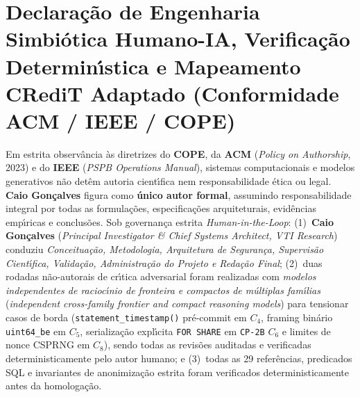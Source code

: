 \documentclass[10pt,twocolumn]{article}
\begin{document}
\section*{Declara\c{c}\~{a}o de Engenharia Simbi\'{o}tica Humano-IA, Verifica\c{c}\~{a}o Determin\'{\i}stica e Mapeamento CRediT Adaptado (Conformidade ACM / IEEE / COPE)}

Em estrita observ\^{a}ncia \`{a}s diretrizes do \textbf{COPE}, da \textbf{ACM} (\emph{Policy on Authorship}, 2023) e do \textbf{IEEE} (\emph{PSPB Operations Manual}), sistemas computacionais e modelos generativos n\~{a}o det\^{e}m autoria cient\'{\i}fica nem responsabilidade \'{e}tica ou legal. \textbf{Caio Gon\c{c}alves} figura como \textbf{\'{u}nico autor formal}, assumindo responsabilidade integral por todas as formula\c{c}\~{o}es, especifica\c{c}\~{o}es arquiteturais, evid\^{e}ncias emp\'{\i}ricas e conclus\~{o}es. Sob governan\c{c}a estrita \emph{Human-in-the-Loop}: (1)~\textbf{Caio Gon\c{c}alves} (\emph{Principal Investigator \& Chief Systems Architect, VTI Research}) conduziu \emph{Conceitua\c{c}\~{a}o, Metodologia, Arquitetura de Seguran\c{c}a, Supervis\~{a}o Cient\'{\i}fica, Valida\c{c}\~{a}o, Administra\c{c}\~{a}o do Projeto e Reda\c{c}\~{a}o Final}; (2)~duas rodadas n\~{a}o-autorais de cr\'{\i}tica adversarial foram realizadas com \emph{modelos independentes de racioc\'{\i}nio de fronteira e compactos de m\'{u}ltiplas fam\'{\i}lias} (\emph{independent cross-family frontier and compact reasoning models}) para tensionar casos de borda (\texttt{statement\_timestamp()} pr\'{e}-commit em $C_4$, framing bin\'{a}rio \texttt{uint64\_be} em $C_5$, serializa\c{c}\~{a}o expl\'{\i}cita \texttt{FOR SHARE} em \texttt{CP-2B} $C_6$ e limites de nonce CSPRNG em $C_8$), sendo todas as revis\~{o}es auditadas e verificadas deterministicamente pelo autor humano; e (3)~todas as 29 refer\^{e}ncias, predicados SQL e invariantes de anonimiza\c{c}\~{a}o estrita foram verificados deterministicamente antes da homologa\c{c}\~{a}o.



\end{document}
